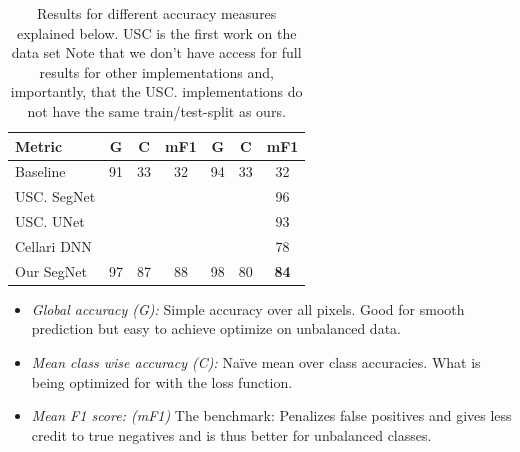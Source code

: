 \documentclass[
    ,title     = {{Image Segmentation for Smart Agriculture}}
    ,subject   = {{This is the subject of my work}}
    ,papersize = {{a1paper}}
    ,nocrop
]{dtuposter}
\begin{document}
\begin{dtupostercontent}
\begin{table}
\begin{tabular}{l|ccc|ccc|}
		\rule[-1ex]{0pt}{2.5ex} Metric  & G & C &  mF1 & G & C &  mF1 \\ 
		\hline
		\rule[-1ex]{0pt}{2.5ex} Baseline& 91& 33   &32  &94  &33  &32  \\ 
		
		\rule[-1ex]{0pt}{2.5ex} USC. SegNet    &    &  &  &  & &   96  \\ 
		\rule[-1ex]{0pt}{2.5ex} USC. UNet   &  &    &  &  & &93  \\ 
		\rule[-1ex]{0pt}{2.5ex} Cellari DNN   &    &  &  &  &  &78  \\ 
		\hline 
		\rule[-1ex]{0pt}{2.5ex} Our SegNet & 97 & 87  &88  & 98  &80&\textbf{84}  \\ 
	\end{tabular} 
\caption{Results for different accuracy measures explained below. USC is the first work on the data set \cite{USC.} Note that we don't have access for full results for other implementations and, importantly, that the USC. implementations do not have the same train/test-split as ours.}
\end{table}

\begin{itemize}
	\item \textit{Global accuracy (G):} Simple accuracy over all pixels. Good for smooth prediction but easy to achieve optimize on unbalanced data.
	\item \textit{Mean class wise accuracy (C):} Naïve mean over class accuracies. What is being optimized for with the loss function.
	\item \textit{Mean F1 score: (mF1)} The benchmark: Penalizes false positives and gives less credit to true negatives and is thus better for unbalanced classes. 
\end{itemize}


\end{dtupostercontent}
\end{document}

